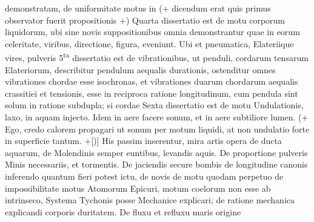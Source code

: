 demonstratam, de uniformitate motus in  (+ dicendum erat quis primus observator fuerit propositionis +) Quarta dissertatio est de motu corporum liquidorum, ubi sine novis suppositionibus omnia demonstrantur quae in eorum celeritate, viribus, directione, figura, eveniunt. Ubi et pneumatica, Elateriique vires, pulveris  5\textsuperscript{ta} dissertatio est de vibrationibus, ut penduli, cordarum tensarum Elateriorum, describitur pendulum  aequalis durationis, ostenditur omnes vibrationes chordae esse isochronas, et vibrationes duarum chordarum aequalis crassitiei et tensionis, esse in reciproca ratione longitudinum, cum pendula sint solum in ratione subdupla; si cordae
 Sexta dissertatio est de motu Undulationis,  laxo, in aquam injecto. Idem in aere facere sonum, et in aere subtiliore lumen. (+ Ego, credo calorem propagari ut sonum per motum liquidi, at non  undulatio forte in superficie tantum. +[\thinspace )\thinspace] His passim inserentur, mira artis opera de ducta aquarum, de Molendinis semper euntibus, levandis aquis. De proportione pulveris Minis necessariis, et tormentis. De jaciendis secure bombis de longitudine canonis inferendo quantum fieri potest ictu, de novis  de motu quodam perpetuo de impossibilitate motus Atomorum Epicuri, motum coelorum non esse ab intrinseco, Systema Tychonis\protect{} posse Mechanice explicari; de ratione mechanica explicandi corporis duritatem. De fluxu et refluxu maris origine 
\pend 
\count{}
\count{}
 

